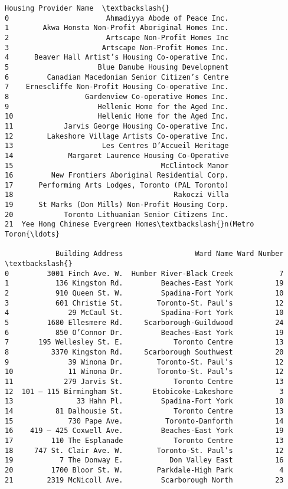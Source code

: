 \documentclass[11pt]{article}
\makeatletter
\newcommand{\boxspacing}{\kern\kvtcb@left@rule\kern\kvtcb@boxsep}
\newcommand{\prompt}[4]{
        {\ttfamily\llap{{\color{#2}[#3]:\hspace{3pt}#4}}\vspace{-\baselineskip}}
    }
\makeatother
\begin{document}
            \begin{tcolorbox}[breakable, size=fbox, boxrule=.5pt, pad at break*=1mm, opacityfill=0]
\prompt{Out}{outcolor}{60}{\boxspacing}
\begin{Verbatim}[commandchars=\\\{\}]
                                Housing Provider Name  \textbackslash{}
0                       Ahmadiyya Abode of Peace Inc.
1        Akwa Honsta Non-Profit Aboriginal Homes Inc.
2                       Artscape Non-Profit Homes Inc
3                      Artscape Non-Profit Homes Inc.
4      Beaver Hall Artist’s Housing Co-operative Inc.
5                     Blue Danube Housing Development
6         Canadian Macedonian Senior Citizen’s Centre
7    Ernescliffe Non-Profit Housing Co-operative Inc.
8                  Gardenview Co-operative Homes Inc.
9                     Hellenic Home for the Aged Inc.
10                    Hellenic Home for the Aged Inc.
11            Jarvis George Housing Co-operative Inc.
12        Lakeshore Village Artists Co-operative Inc.
13                     Les Centres D’Accueil Heritage
14             Margaret Laurence Housing Co-Operative
15                                   McClintock Manor
16         New Frontiers Aboriginal Residential Corp.
17      Performing Arts Lodges, Toronto (PAL Toronto)
18                                      Rakoczi Villa
19      St Marks (Don Mills) Non-Profit Housing Corp.
20            Toronto Lithuanian Senior Citizens Inc.
21  Yee Hong Chinese Evergreen Homes\textbackslash{}n(Metro Toron{\ldots}

            Building Address                 Ward Name Ward Number  \textbackslash{}
0         3001 Finch Ave. W.  Humber River-Black Creek           7
1           136 Kingston Rd.         Beaches-East York          19
2           910 Queen St. W.         Spadina-Fort York          10
3           601 Christie St.        Toronto-St. Paul’s          12
4              29 McCaul St.         Spadina-Fort York          10
5         1680 Ellesmere Rd.     Scarborough-Guildwood          24
6           850 O’Connor Dr.         Beaches-East York          19
7       195 Wellesley St. E.            Toronto Centre          13
8          3370 Kingston Rd.     Scarborough Southwest          20
9              39 Winona Dr.        Toronto-St. Paul’s          12
10             11 Winona Dr.        Toronto-St. Paul’s          12
11            279 Jarvis St.            Toronto Centre          13
12  101 – 115 Birmingham St.       Etobicoke-Lakeshore           3
13               33 Hahn Pl.         Spadina-Fort York          10
14          81 Dalhousie St.            Toronto Centre          13
15             730 Pape Ave.          Toronto-Danforth          14
16    419 – 425 Coxwell Ave.         Beaches-East York          19
17         110 The Esplanade            Toronto Centre          13
18     747 St. Clair Ave. W.        Toronto-St. Paul’s          12
19           7 The Donway E.           Don Valley East          16
20         1700 Bloor St. W.        Parkdale-High Park           4
21        2319 McNicoll Ave.         Scarborough North          23


\end{Verbatim}
\end{tcolorbox}
\end{document}
